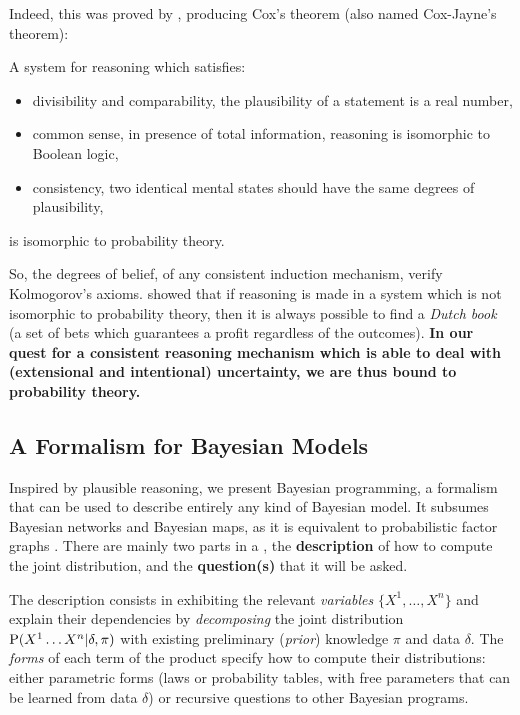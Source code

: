 Indeed, this was proved by \cite{Cox46}, producing Cox's theorem (also named Cox-Jayne's theorem):
\begin{mythm}
A system for reasoning which satisfies:
\begin{itemize}
    \item divisibility and comparability, the plausibility of a statement is a real number,
    \item common sense, in presence of total information, reasoning is isomorphic to Boolean logic,
    \item consistency, two identical mental states should have the same degrees of plausibility,
\end{itemize}
is isomorphic to probability theory.
\end{mythm}
So, the degrees of belief, of any consistent induction mechanism, verify Kolmogorov's axioms. \cite{DeFinetti37} showed that if reasoning is made in a system which is not isomorphic to probability theory, then it is always possible to find a \textit{Dutch book} (a set of bets which guarantees a profit regardless of the outcomes). \textbf{In our quest for a consistent reasoning mechanism which is able to deal with (extensional and intentional) uncertainty, we are thus bound to probability theory.} %


\subsection{A Formalism for Bayesian Models}
Inspired by plausible reasoning, we present Bayesian programming, a formalism that can be used to describe entirely any kind of Bayesian model. It subsumes Bayesian networks and Bayesian maps, as it is equivalent to probabilistic factor graphs \cite{Diard03}. There are mainly two parts in a , the \textbf{description} of how to compute the joint distribution, and the \textbf{question(s)} that it will be asked. 

The description consists in exhibiting the relevant \textit{variables} $\{X^1,\dots,X^n\}$ and explain their dependencies by \textit{decomposing} the joint distribution $\mathrm{P}(X^1\dots X^n | \delta, \pi)$ with existing preliminary (\textit{prior}) knowledge $\pi$ and data $\delta$. The \textit{forms} of each term of the product specify how to compute their distributions: either parametric forms (laws or probability tables, with free parameters that can be learned from data $\delta$) or recursive questions to other Bayesian programs.

